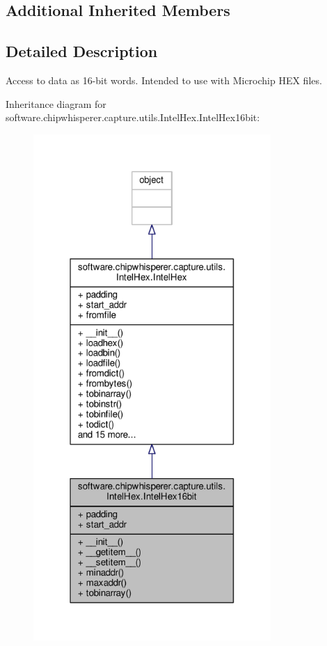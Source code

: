 \subsection*{Additional Inherited Members}


\subsection{Detailed Description}
\begin{DoxyVerb}Access to data as 16-bit words. Intended to use with Microchip HEX files.\end{DoxyVerb}
 

Inheritance diagram for software.\+chipwhisperer.\+capture.\+utils.\+Intel\+Hex.\+Intel\+Hex16bit\+:\nopagebreak
\begin{figure}[H]
\begin{center}
\leavevmode
\includegraphics[width=256pt]{df/d2d/classsoftware_1_1chipwhisperer_1_1capture_1_1utils_1_1IntelHex_1_1IntelHex16bit__inherit__graph}
\end{center}
\end{figure}


